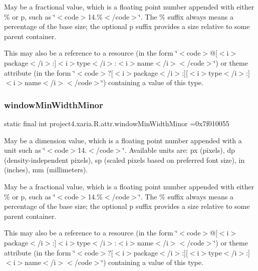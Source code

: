 May be a fractional value, which is a floating point number appended with either \% or p, such as \char`\"{}$<$code$>$14.\%$<$/code$>$\char`\"{}. The \% suffix always means a percentage of the base size; the optional p suffix provides a size relative to some parent container. 

This may also be a reference to a resource (in the form \char`\"{}$<$code$>$@\mbox{[}$<$i$>$package$<$/i$>$\+:\mbox{]}$<$i$>$type$<$/i$>$\+:$<$i$>$name$<$/i$>$$<$/code$>$\char`\"{}) or theme attribute (in the form \char`\"{}$<$code$>$?\mbox{[}$<$i$>$package$<$/i$>$\+:\mbox{]}\mbox{[}$<$i$>$type$<$/i$>$\+:\mbox{]}$<$i$>$name$<$/i$>$$<$/code$>$\char`\"{}) containing a value of this type. \mbox{\label{classproject4_1_1xaria_1_1R_1_1attr_ae0595a8e89c06d3d94aa4a6edadde30b}} 
\subsubsection{\texorpdfstring{window\+Min\+Width\+Minor}{windowMinWidthMinor}}
{\footnotesize\ttfamily static final int project4.\+xaria.\+R.\+attr.\+window\+Min\+Width\+Minor =0x7f010055\hspace{0.3cm}{\ttfamily [static]}}

May be a dimension value, which is a floating point number appended with a unit such as \char`\"{}$<$code$>$14.\+5sp$<$/code$>$\char`\"{}. Available units are\+: px (pixels), dp (density-\/independent pixels), sp (scaled pixels based on preferred font size), in (inches), mm (millimeters). 

May be a fractional value, which is a floating point number appended with either \% or p, such as \char`\"{}$<$code$>$14.\%$<$/code$>$\char`\"{}. The \% suffix always means a percentage of the base size; the optional p suffix provides a size relative to some parent container. 

This may also be a reference to a resource (in the form \char`\"{}$<$code$>$@\mbox{[}$<$i$>$package$<$/i$>$\+:\mbox{]}$<$i$>$type$<$/i$>$\+:$<$i$>$name$<$/i$>$$<$/code$>$\char`\"{}) or theme attribute (in the form \char`\"{}$<$code$>$?\mbox{[}$<$i$>$package$<$/i$>$\+:\mbox{]}\mbox{[}$<$i$>$type$<$/i$>$\+:\mbox{]}$<$i$>$name$<$/i$>$$<$/code$>$\char`\"{}) containing a value of this type. \mbox{\label{classproject4_1_1xaria_1_1R_1_1attr_af115a2b2aa1836f49d8fe3af8acfac1a}} 
